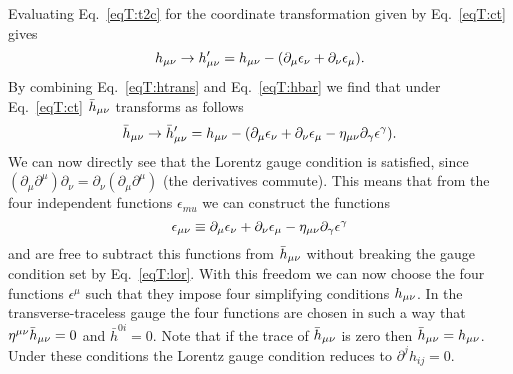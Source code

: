 Evaluating Eq.~\ref{eqT:t2c} for the coordinate transformation given by Eq.~\ref{eqT:ct} gives
\begin{equation} \label{eqT:htrans}
h_{\mu\nu} \rightarrow h'_{\mu\nu} = h_{\mu\nu} - (\partial_{\mu} \epsilon_{\nu} + \partial_{\nu} \epsilon_{\mu}). 
\end{equation}
By combining Eq.~\ref{eqT:htrans} and Eq.~\ref{eqT:hbar} we find that under Eq.~\ref{eqT:ct} $\bar{h}_{\mu\nu}$ transforms as follows
\begin{equation} \label{eqT:hbartrans}
\bar{h}_{\mu\nu} \rightarrow \bar{h}'_{\mu\nu} =  {h}_{\mu\nu} - (\partial_{\mu} \epsilon_{\nu} + \partial_{\nu} \epsilon_{\mu} - \eta_{\mu\nu}\partial_{\gamma} \epsilon^{\gamma}). 
\end{equation}
We can now directly see that the Lorentz gauge condition is satisfied, since $(\partial_{\mu} \partial^{\mu})\partial_{\nu} = \partial_{\nu}(\partial_{\mu} \partial^{\mu})$ (the derivatives commute). This means that from the four independent functions $\epsilon_{mu}$ we can construct the functions 
\begin{equation}
\epsilon_{\mu\nu} \equiv \partial_{\mu} \epsilon_{\nu} + \partial_{\nu} \epsilon_{\mu} - \eta_{\mu\nu}\partial_{\gamma} \epsilon^{\gamma}
\end{equation}
and are free to subtract this functions from $\bar{h}_{\mu\nu}$ without breaking the gauge condition set by Eq.~\ref{eqT:lor}. 
With this freedom we can now choose the four functions $\epsilon^{\mu}$ such that they impose four simplifying conditions  $h_{\mu\nu}$.
In the transverse-traceless gauge the four functions are chosen in such a way that $\eta^{\mu\nu}\bar{h}_{\mu\nu} = 0$ and $\bar{h}^{0 i} = 0$.
Note that if the trace of $\bar{h}_{\mu\nu}$ is zero then $\bar{h}_{\mu\nu} = h_{\mu\nu}$. Under these conditions the Lorentz gauge condition
reduces to $\partial^j h_{ij} = 0$.

